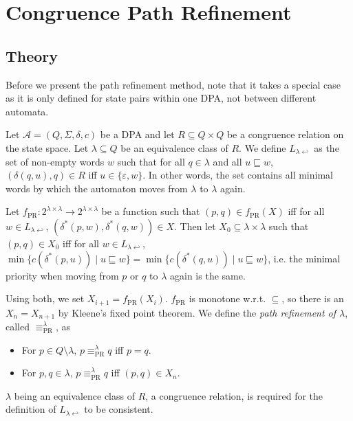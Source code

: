 
\chapter{Congruence Path Refinement}
\label{chap:pr}

\section{Theory}

Before we present the path refinement method, note that it takes a special case as it is only defined for state pairs within one DPA, not between different automata.

\begin{defn}
	Let $\mathcal{A} = (Q, \Sigma, \delta, c)$ be a DPA and let $R \subseteq Q \times Q$ be a congruence relation on the state space. Let $\lambda \subseteq Q$ be an equivalence class of $R$. We define $L_{\lambda \hookleftarrow}$ as the set of non-empty words $w$ such that for all $q \in \lambda$ and all $u \sqsubseteq w$, $(\delta(q, u), q) \in R$ iff $u \in \{\varepsilon, w\}$. In other words, the set contains all minimal words by which the automaton moves from $\lambda$ to $\lambda$ again.
	
	Let $f_\text{PR} : 2^{\lambda \times \lambda} \rightarrow 2^{\lambda \times \lambda}$ be a function such that $(p, q) \in f_\text{PR}(X)$  iff for all $w \in L_{\lambda \hookleftarrow}$, $(\delta^*(p, w), \delta^*(q, w)) \in X$.
	Then let $X_0 \subseteq \lambda \times \lambda$ such that $(p, q) \in X_0$ iff for all $w \in L_{\lambda \hookleftarrow}$, $\min \{ c(\delta^*(p, u)) \mid u \sqsubseteq w \} = \min \{ c(\delta^*(q, u)) \mid u \sqsubseteq w \}$, i.e. the minimal priority when moving from $p$ or $q$ to $\lambda$ again is the same.
	
	Using both, we set $X_{i+1} = f_\text{PR}(X_i)$. $f_\text{PR}$ is monotone w.r.t. $\subseteq$, so there is an $X_n = X_{n+1}$ by Kleene's fixed point theorem. We define the \emph{path refinement of $\lambda$}, called $\equiv_\text{PR}^\lambda$, as %
	\begin{itemize}
		\item For $p \in Q \setminus \lambda$, $p \equiv_\text{PR}^\lambda q$ iff $p = q$.
		\item For $p, q \in \lambda$, $p \equiv_\text{PR}^\lambda q$ iff $(p, q) \in X_n$.
	\end{itemize}
\end{defn}

$\lambda$ being an equivalence class of $R$, a congruence relation, is required for the definition of $L_{\lambda \hookleftarrow}$ to be consistent.


